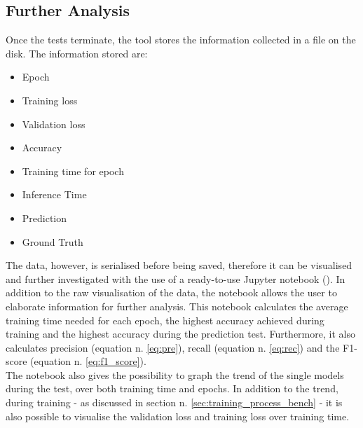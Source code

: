 \subsection{Further Analysis}
Once the tests terminate, the tool stores the information collected in a file on the disk. The information stored are:
\begin{itemize}
\item Epoch
\item Training loss
\item Validation loss
\item Accuracy
\item Training time for epoch
\item Inference Time
\item Prediction
\item Ground Truth
\end{itemize}
The data, however, is serialised before being saved, therefore it can be visualised and further investigated with the use of a ready-to-use Jupyter notebook (\cite{Kluyver2016jupyter}). In addition to the raw visualisation of the data, the notebook allows the user to elaborate information for further analysis. This notebook calculates the average training time needed for each epoch, the highest accuracy achieved during training and the highest accuracy during the prediction test.  Furthermore, it also calculates precision (equation n. \ref{eq:pre}), recall (equation n. \ref{eq:rec}) and the F1-score (equation n. \ref{eq:f1_score}). \\
The notebook also gives the possibility to graph the trend of the single models during the test, over both training time and epochs. In addition to the trend, during training - as discussed in section n. \ref{sec:training_process_bench} - it is also possible to visualise the validation loss and training loss over training time. 
